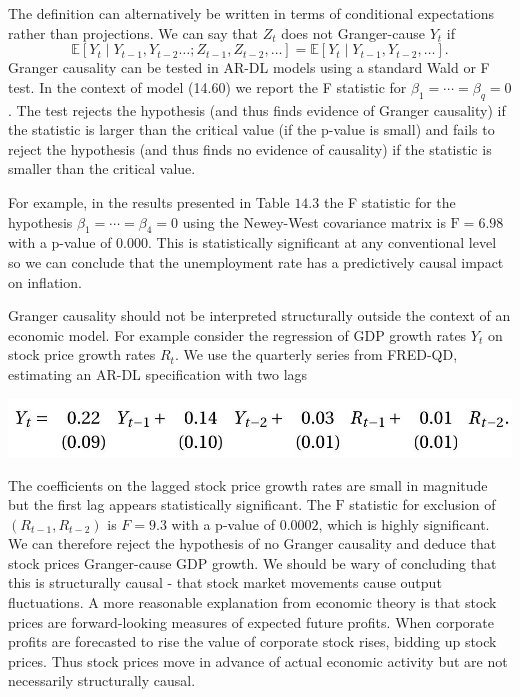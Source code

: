 \documentclass[10pt]{article}
\begin{document}
The definition can alternatively be written in terms of conditional expectations rather than projections. We can say that $Z_{t}$ does not Granger-cause $Y_{t}$ if
$$
\mathbb{E}\left[Y_{t} \mid Y_{t-1}, Y_{t-2} \ldots ; Z_{t-1}, Z_{t-2}, \ldots\right]=\mathbb{E}\left[Y_{t} \mid Y_{t-1}, Y_{t-2}, \ldots\right] .
$$
Granger causality can be tested in AR-DL models using a standard Wald or F test. In the context of model (14.60) we report the F statistic for $\beta_{1}=\cdots=\beta_{q}=0$. The test rejects the hypothesis (and thus finds evidence of Granger causality) if the statistic is larger than the critical value (if the p-value is small) and fails to reject the hypothesis (and thus finds no evidence of causality) if the statistic is smaller than the critical value.

For example, in the results presented in Table $14.3$ the F statistic for the hypothesis $\beta_{1}=\cdots=\beta_{4}=0$ using the Newey-West covariance matrix is $\mathrm{F}=6.98$ with a p-value of $0.000$. This is statistically significant at any conventional level so we can conclude that the unemployment rate has a predictively causal impact on inflation.

Granger causality should not be interpreted structurally outside the context of an economic model. For example consider the regression of GDP growth rates $Y_{t}$ on stock price growth rates $R_{t}$. We use the quarterly series from FRED-QD, estimating an AR-DL specification with two lags

\includegraphics[max width=\textwidth]{2022_10_23_6047885e7d154c9f28afg-53}

The coefficients on the lagged stock price growth rates are small in magnitude but the first lag appears statistically significant. The $\mathrm{F}$ statistic for exclusion of $\left(R_{t-1}, R_{t-2}\right)$ is $F=9.3$ with a $\mathrm{p}$-value of $0.0002$, which is highly significant. We can therefore reject the hypothesis of no Granger causality and deduce that stock prices Granger-cause GDP growth. We should be wary of concluding that this is structurally causal - that stock market movements cause output fluctuations. A more reasonable explanation from economic theory is that stock prices are forward-looking measures of expected future profits. When corporate profits are forecasted to rise the value of corporate stock rises, bidding up stock prices. Thus stock prices move in advance of actual economic activity but are not necessarily structurally causal.
\end{document}
